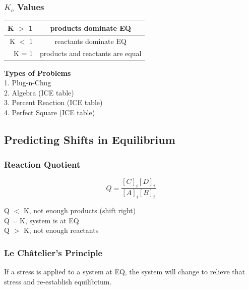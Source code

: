 \documentclass[11pt]{article}
\begin{document}
    \subsubsection{$K_{c}$ Values}

    \begin{center}
        \begin{tabular}{ | r | c |}
            \hline
            K $>$ 1 & products dominate EQ \\ \hline
            K $<$ 1 & reactants dominate EQ \\ \hline
            K = 1 & products and reactants are equal \\ \hline
        \end{tabular}
    \end{center}

    \textbf{Types of Problems} \\
    1. Plug-n-Chug \\
    2. Algebra (ICE table) \\
    3. Percent Reaction (ICE table) \\
    4. Perfect Square (ICE table)

    \subsection{Predicting Shifts in Equilibrium}
    \subsubsection{Reaction Quotient}

    \begin{equation*}
        Q = \frac{[C]_{i}[D]_{i}}{[A]_{i}[B]_{i}}
    \end{equation*}

    \begin{center}
        Q $<$ K, not enough products (shift right) \\
        Q = K, system is at EQ \\
        Q $>$ K, not enough reactants
    \end{center}

    \subsubsection{Le Ch\^atelier's Principle}
    If a stress is applied to a system at EQ, the system will change to relieve that stress and re-establish equilibrium. \\
\end{document}
